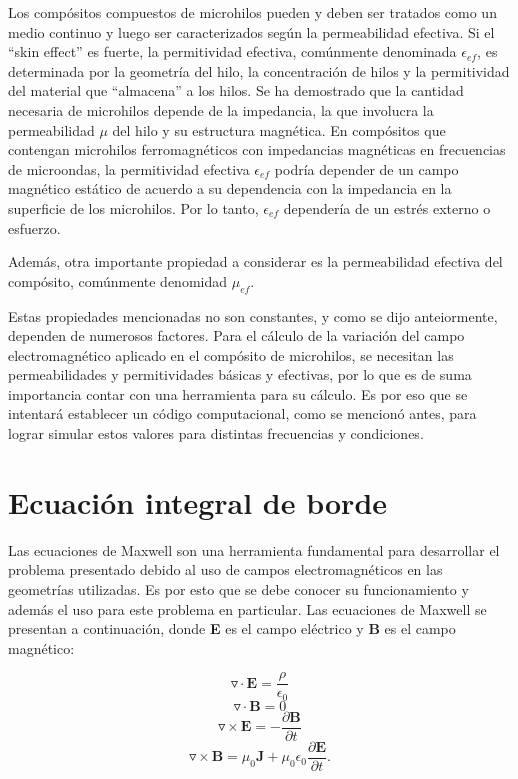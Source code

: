 \documentclass[12pt,letterpaper]{report}
\numberwithin{equation}{section}
\begin{document}
Los compósitos compuestos de microhilos pueden y deben ser tratados como un medio continuo y luego ser caracterizados según la permeabilidad efectiva. Si el ``skin effect'' es fuerte, la permitividad efectiva, comúnmente denominada $\epsilon_{ef}$, es determinada por la geometría del hilo, la concentración de hilos y la permitividad del material que ``almacena'' a los hilos. Se ha demostrado que la cantidad necesaria de microhilos depende de la impedancia, la que involucra la permeabilidad $\mu$ del hilo y su estructura magnética. En compósitos que contengan microhilos ferromagnéticos con impedancias magnéticas en frecuencias de microondas, la permitividad efectiva $\epsilon_{ef}$ podría depender de un campo magnético estático de acuerdo a su dependencia con la impedancia en la superficie de los microhilos. Por lo tanto, $\epsilon_{ef}$ dependería de un estrés externo o esfuerzo. \cite{Wire_theory_2}

Además, otra importante propiedad a considerar es la permeabilidad efectiva del compósito, comúnmente denomidad $\mu_{ef}$. 

Estas propiedades mencionadas no son constantes, y como se dijo anteiormente, dependen de numerosos factores. Para el cálculo de la variación del campo electromagnético aplicado en el compósito de microhilos, se necesitan las permeabilidades y permitividades básicas y efectivas, por lo que es de suma importancia contar con una herramienta para su cálculo. Es por eso que se intentará establecer un código computacional, como se mencionó antes, para lograr simular estos valores para distintas frecuencias y condiciones.
 

\chapter{Ecuación integral de borde}


Las ecuaciones de Maxwell son una herramienta fundamental para desarrollar el problema presentado debido al uso de campos electromagnéticos en las geometrías utilizadas. Es por esto que se debe conocer su funcionamiento y además el uso para este problema en particular. Las ecuaciones de Maxwell se presentan a continuación, donde \textbf{E} es el campo eléctrico y \textbf{B} es el campo magnético:

\begin{equation}
\triangledown\cdot\textbf{E} = \frac{\rho}{\epsilon_0}
\label{eq:Ley de Gauss}
\end{equation}
\begin{equation}
\triangledown\cdot\textbf{B} = 0
\label{eq:Maxwell no name}
\end{equation}
\begin{equation}
\triangledown\times\textbf{E} = -\frac{\partial\textbf{B}}{\partial t}
\label{eq:Ley de Faraday }
\end{equation}
\begin{equation}
\triangledown\times\textbf{B} = \mu_0 \textbf{J} + \mu_0\epsilon_0\frac{\partial\textbf{E}}{\partial t}.
\label{eq:Ley de Ampere}
\end{equation}
\\
\end{document}
